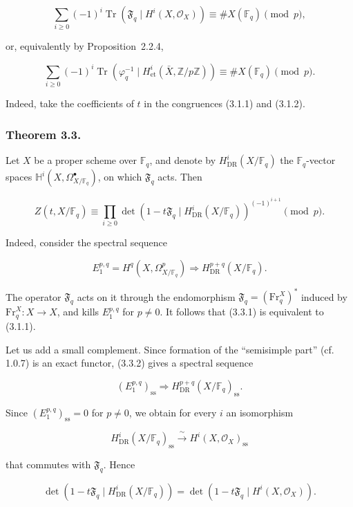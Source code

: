 \begin{equation}\tag{3.2.1}
\sum_{i\geq0}(-1)^i
\operatorname{Tr}\!\left(\mathfrak F_q\mid H^i(X,\mathcal O_X)\right)
\equiv \#X(\mathbb F_q)\pmod p,
\end{equation}

or, equivalently by Proposition~2.2.4,

\begin{equation}\tag{3.2.2}
\sum_{i\geq0}(-1)^i
\operatorname{Tr}\!\left(\varphi_q^{-1}\mid
H^i_{\mathrm{et}}(\bar X,\mathbb Z/p\mathbb Z)\right)
\equiv \#X(\mathbb F_q)\pmod p.
\end{equation}

Indeed, take the coefficients of $t$ in the congruences (3.1.1) and (3.1.2).

\subsubsection*{Theorem 3.3.}
Let $X$ be a proper scheme over $\mathbb F_q$, and denote by
$H^i_{\mathrm{DR}}(X/\mathbb F_q)$ the $\mathbb F_q$-vector spaces
$\mathbb H^i(X,\Omega^\bullet_{X/\mathbb F_q})$, on which $\mathfrak F_q$ acts. Then

\begin{equation}\tag{3.3.1}
Z(t,X/\mathbb F_q)
\equiv
\prod_{i\geq0}
\det\!\left(1-t\mathfrak F_q\mid
H^i_{\mathrm{DR}}(X/\mathbb F_q)\right)^{(-1)^{i+1}}
\pmod p.
\end{equation}

Indeed, consider the spectral sequence

\begin{equation}\tag{3.3.2}
E_1^{p,q}=H^q(X,\Omega^p_{X/\mathbb F_q})
\Longrightarrow H^{p+q}_{\mathrm{DR}}(X/\mathbb F_q).
\end{equation}

The operator $\mathfrak F_q$ acts on it through the endomorphism
$\mathfrak F_q=(\mathrm{Fr}_q^X)^*$ induced by
$\mathrm{Fr}_q^X:X\longrightarrow X$, and kills $E_1^{p,q}$ for $p\ne0$.
It follows that (3.3.1) is equivalent to (3.1.1).

Let us add a small complement. Since formation of the ``semisimple part''
(cf. 1.0.7) is an exact functor, (3.3.2) gives a spectral sequence

\begin{equation}\tag{3.3.3}
(E_1^{p,q})_{\mathrm{ss}}
\Longrightarrow H^{p+q}_{\mathrm{DR}}(X/\mathbb F_q)_{\mathrm{ss}}.
\end{equation}

Since $(E_1^{p,q})_{\mathrm{ss}}=0$ for $p\ne0$, we obtain for every $i$ an
isomorphism

\begin{equation}\tag{3.3.4}
H^i_{\mathrm{DR}}(X/\mathbb F_q)_{\mathrm{ss}}
\xrightarrow{\ \sim\ }
H^i(X,\mathcal O_X)_{\mathrm{ss}}
\end{equation}

that commutes with $\mathfrak F_q$. Hence

\begin{equation}\tag{3.3.5}
\det\!\left(1-t\mathfrak F_q\mid H^i_{\mathrm{DR}}(X/\mathbb F_q)\right)
=
\det\!\left(1-t\mathfrak F_q\mid H^i(X,\mathcal O_X)\right).
\end{equation}
